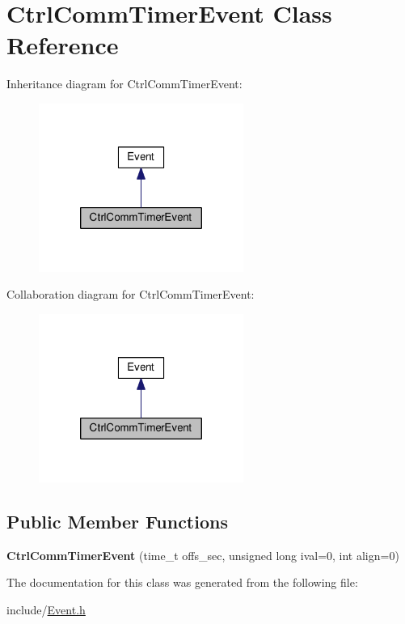 \hypertarget{classCtrlCommTimerEvent}{}\section{Ctrl\+Comm\+Timer\+Event Class Reference}
\label{classCtrlCommTimerEvent}


Inheritance diagram for Ctrl\+Comm\+Timer\+Event\+:
\nopagebreak
\begin{figure}[H]
\begin{center}
\leavevmode
\includegraphics[width=190pt]{classCtrlCommTimerEvent__inherit__graph}
\end{center}
\end{figure}


Collaboration diagram for Ctrl\+Comm\+Timer\+Event\+:
\nopagebreak
\begin{figure}[H]
\begin{center}
\leavevmode
\includegraphics[width=190pt]{classCtrlCommTimerEvent__coll__graph}
\end{center}
\end{figure}
\subsection*{Public Member Functions}
\begin{DoxyCompactItemize}
\item 
\mbox{\label{classCtrlCommTimerEvent_a75281b9d41f9f484711fd4d5fa09fe16}} 
{\bfseries Ctrl\+Comm\+Timer\+Event} (time\+\_\+t offs\+\_\+sec, unsigned long ival=0, int align=0)
\end{DoxyCompactItemize}


The documentation for this class was generated from the following file\+:\begin{DoxyCompactItemize}
\item 
include/\hyperlink{Event_8h}{Event.\+h}\end{DoxyCompactItemize}
